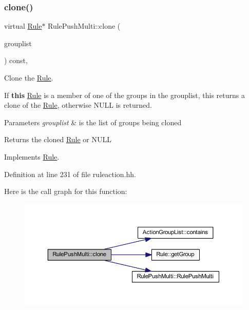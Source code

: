 \subsubsection{\texorpdfstring{clone()}{clone()}}
{\footnotesize\ttfamily virtual \mbox{\hyperlink{class_rule}{Rule}}$\ast$ Rule\+Push\+Multi\+::clone (\begin{DoxyParamCaption}\item[{const \mbox{\hyperlink{class_action_group_list}{Action\+Group\+List}} \&}]{grouplist }\end{DoxyParamCaption}) const\hspace{0.3cm}{\ttfamily [inline]}, {\ttfamily [virtual]}}



Clone the \mbox{\hyperlink{class_rule}{Rule}}. 

If {\bfseries{this}} \mbox{\hyperlink{class_rule}{Rule}} is a member of one of the groups in the grouplist, this returns a clone of the \mbox{\hyperlink{class_rule}{Rule}}, otherwise N\+U\+LL is returned. 
\begin{DoxyParams}{Parameters}
{\em grouplist} & is the list of groups being cloned \\
\hline
\end{DoxyParams}
\begin{DoxyReturn}{Returns}
the cloned \mbox{\hyperlink{class_rule}{Rule}} or N\+U\+LL 
\end{DoxyReturn}


Implements \mbox{\hyperlink{class_rule_a70de90a76461bfa7ea0b575ce3c11e4d}{Rule}}.



Definition at line 231 of file ruleaction.\+hh.

Here is the call graph for this function\+:
\nopagebreak
\begin{figure}[H]
\begin{center}
\leavevmode
\includegraphics[width=350pt]{class_rule_push_multi_ae44a8242704738c9f0d415c3987da4b3_cgraph}
\end{center}
\end{figure}
\mbox{\label{class_rule_push_multi_a77532a8920828f0155494cfb01c58f09}} 
